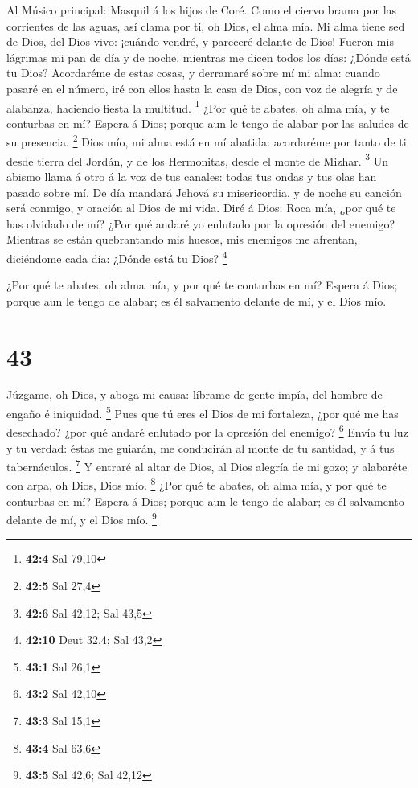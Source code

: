  Al Músico principal: Masquil á los hijos de Coré. Como el
ciervo brama por las corrientes de las aguas, así clama por ti, oh Dios,
el alma mía.  Mi alma tiene sed de Dios, del Dios vivo:
¡cuándo vendré, y pareceré delante de Dios!  Fueron mis
lágrimas mi pan de día y de noche, mientras me dicen todos los días:
¿Dónde está tu Dios?  Acordaréme de estas cosas, y derramaré
sobre mí mi alma: cuando pasaré en el número, iré con ellos hasta la
casa de Dios, con voz de alegría y de alabanza, haciendo fiesta la
multitud. \footnote{\textbf{42:4} Sal 79,10}  ¿Por qué te
abates, oh alma mía, y te conturbas en mí? Espera á Dios; porque aun le
tengo de alabar por las saludes de su presencia. \footnote{\textbf{42:5}
  Sal 27,4}  Dios mío, mi alma está en mí abatida:
acordaréme por tanto de ti desde tierra del Jordán, y de los Hermonitas,
desde el monte de Mizhar. \footnote{\textbf{42:6} Sal 42,12; Sal 43,5}
 Un abismo llama á otro á la voz de tus canales: todas tus
ondas y tus olas han pasado sobre mí.  De día mandará Jehová
su misericordia, y de noche su canción será conmigo, y oración al Dios
de mi vida.  Diré á Dios: Roca mía, ¿por qué te has olvidado
de mí? ¿Por qué andaré yo enlutado por la opresión del enemigo?
 Mientras se están quebrantando mis huesos, mis enemigos me
afrentan, diciéndome cada día: ¿Dónde está tu Dios? \footnote{\textbf{42:10}
  Deut 32,4; Sal 43,2}

 ¿Por qué te abates, oh alma mía, y por qué te conturbas en
mí? Espera á Dios; porque aun le tengo de alabar; es él salvamento
delante de mí, y el Dios mío.

\hypertarget{section-42}{%
\section{43}\label{section-42}}

 Júzgame, oh Dios, y aboga mi causa: líbrame de gente impía,
del hombre de engaño é iniquidad. \footnote{\textbf{43:1} Sal 26,1}
 Pues que tú eres el Dios de mi fortaleza, ¿por qué me has
desechado? ¿por qué andaré enlutado por la opresión del enemigo?
\footnote{\textbf{43:2} Sal 42,10}  Envía tu luz y tu
verdad: éstas me guiarán, me conducirán al monte de tu santidad, y á tus
tabernáculos. \footnote{\textbf{43:3} Sal 15,1}  Y entraré
al altar de Dios, al Dios alegría de mi gozo; y alabaréte con arpa, oh
Dios, Dios mío. \footnote{\textbf{43:4} Sal 63,6}  ¿Por qué
te abates, oh alma mía, y por qué te conturbas en mí? Espera á Dios;
porque aun le tengo de alabar; es él salvamento delante de mí, y el Dios
mío. \footnote{\textbf{43:5} Sal 42,6; Sal 42,12}


